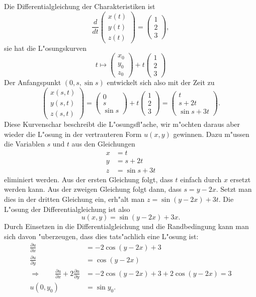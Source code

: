 Die Differentialgleichung der Charakteristiken ist
\[
\frac{d}{dt}\begin{pmatrix}x(t)\\y(t)\\z(t)\end{pmatrix}
=
\begin{pmatrix}1\\2\\3\end{pmatrix},
\]
sie hat die L"osungskurven
\[
t\mapsto\begin{pmatrix}x_0\\y_0\\z_0\end{pmatrix}+t\begin{pmatrix}1\\2\\3\end{pmatrix}
\]
Der Anfangspunkt $(0,s,\sin s)$ entwickelt sich also mit der Zeit zu
\[
\begin{pmatrix}
x(s,t)\\
y(s,t)\\
z(s,t)
\end{pmatrix}
=
\begin{pmatrix}0\\s\\\sin s\end{pmatrix}+t\begin{pmatrix}1\\2\\3\end{pmatrix}
=
\begin{pmatrix}
t\\
s+2t\\
\sin s+3t
\end{pmatrix}.
\]
Diese Kurvenschar beschreibt die L"osungsfl"ache, wir m"ochten daraus aber
wieder die L"osung in der vertrauteren Form $u(x,y)$ gewinnen.
Dazu m"ussen die Variablen $s$ und $t$ aus den Gleichungen
\begin{align*}
x&=t\\
y&=s+2t\\
z&=\sin s+3t
\end{align*}
eliminiert werden.
Aus der ersten Gleichung folgt, dass $t$ einfach durch $x$ ersetzt werden
kann.
Aus der zweigen Gleichung folgt dann, dass $s=y-2x$.
Setzt man dies in der dritten Gleichung ein, erh"alt man $z=\sin(y-2x)+3t$.
Die L"osung der Differentialgleichung ist also
\[
u(x,y)=\sin(y-2x)+3x.
\]
Durch Einsetzen in die Differentialgleichung und die Randbedingung
kann man sich davon "uberzeugen, dass dies tats"achlich eine L"osung
ist:
\begin{align*}
\frac{\partial u}{\partial x}
&=-2\cos(y-2x)+3
\\
\frac{\partial u}{\partial y}
&=\cos (y-2x)
\\
\Rightarrow\qquad
\frac{\partial u}{\partial x}
+2
\frac{\partial u}{\partial y}
&=
-2\cos(y-2x)+3
+2\cos(y-2x)=3
\\
u(0,y_0)&=\sin y_0.
\end{align*}

